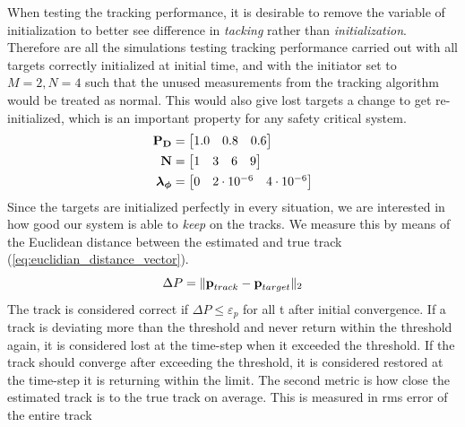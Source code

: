 When testing the tracking performance, it is desirable to remove the variable of initialization to better see difference in \emph{tacking} rather than \emph{initialization}. Therefore are all the simulations testing tracking performance carried out with all targets correctly initialized at initial time, and with the initiator set to \(M=2, N=4\) such that the unused measurements from the tracking algorithm would be treated as normal. This would also give lost targets a change to get re-initialized, which is an important property for any safety critical system.
\begin{equation}\label{eq:tracking_test_table}
\begin{split}
\boldsymbol{\mathbf{P_D}} &= \begin{bmatrix} 1.0 & 0.8 & 0.6 \end{bmatrix} \\
\boldsymbol{\mathbf{N}} &= \begin{bmatrix} 1 & 3 & 6 & 9 \end{bmatrix} \\
\boldsymbol{\mathbf{\lambda_\phi}} &= \begin{bmatrix} 0 & 2\cdot10^{-6} & 4\cdot10^{-6} \end{bmatrix}
\end{split}
\end{equation}
Since the targets are initialized perfectly in every situation, we are interested in how good our system is able to \emph{keep} on the tracks. We measure this by means of the Euclidean distance between the estimated and true track (\ref{eq:euclidian_distance_vector}).
\begin{equation}
	\Delta P = \| \boldsymbol{\mathbf{p}}_{track}-\boldsymbol{\mathbf{p}}_{target} \|_2
\label{eq:euclidian_distance_vector}
\end{equation}
The track is considered correct if \(\Delta P \leq \varepsilon_p\) for all t after initial convergence. If a track is deviating more than the threshold and never return within the threshold again, it is considered lost at the time-step when it exceeded the threshold. If the track should converge after exceeding the threshold, it is considered restored at the time-step it is returning within the limit. The second metric is how close the estimated track is to the true track on average. This is measured in \gls{rms} error of the entire track

